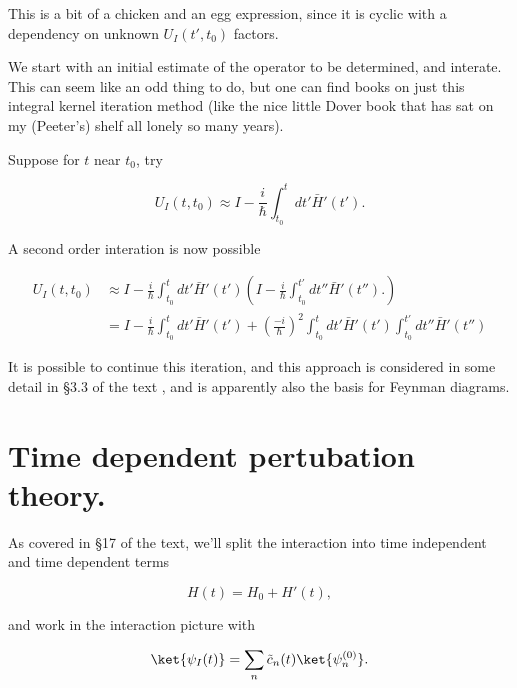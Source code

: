 This is a bit of a chicken and an egg expression, since it is cyclic with a dependency on unknown $U_I(t', t_0)$ factors.

We start with an initial estimate of the operator to be determined, and interate.  This can seem like an odd thing to do, but one can find books on just this integral kernel iteration method (like the nice little Dover book \cite{tricomi1985integral} that has sat on my (Peeter's) shelf all lonely so many years).

Suppose for $t$ near $t_0$, try

\begin{equation}\label{eqn:qmTwoL7:110}
U_I(t, t_0) \approx
I - \frac{i}{\hbar} \int_{t_0}^t dt' \bar{H}'(t').
\end{equation}

A second order interation is now possible

\begin{equation}\label{eqn:qmTwoL7:130}
\begin{aligned}
U_I(t, t_0)
&\approx
I - \frac{i}{\hbar} \int_{t_0}^t dt' \bar{H}'(t') \left(
I - \frac{i}{\hbar} \int_{t_0}^{t'} dt'' \bar{H}'(t'').
\right) \\
&=
I - \frac{i}{\hbar} \int_{t_0}^t dt' \bar{H}'(t') + \left(\frac{-i}{\hbar}\right)^2
\int_{t_0}^t dt' \bar{H}'(t') \int_{t_0}^{t'} dt'' \bar{H}'(t'')
\end{aligned}
\end{equation}

It is possible to continue this iteration, and this approach is considered in some detail in \S 3.3 of the text \cite{desai2009quantum}, and is apparently also the basis for Feynman diagrams.

\section{Time dependent pertubation theory.}

As covered in \S 17 of the text, we'll split the interaction into time independent and time dependent terms

\begin{equation}\label{eqn:qmTwoL7:150}
H(t) = H_0 + H'(t),
\end{equation}

and work in the interaction picture with

\begin{equation}\label{eqn:qmTwoL7:170}
\ket{\psi_I(t)} = \sum_n \tilde{c}_n(t) \ket{\psi_n^{(0)} }.
\end{equation}

